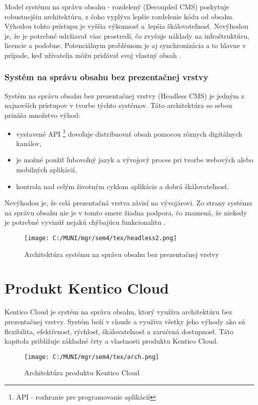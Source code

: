 \documentclass[
  printed, %
  table,   %
  lof,     %
  nolot,     %
  twoside,  
]{fithesis3}
\begin{document}
Model systému na správu obsahu - rozdelený (Decoupled CMS) poskytuje robustnejšiu architektúru, z čoho vyplýva lepšie rozdelenie kódu od obsahu. Výhodou tohto prístupu je vyššia výkonnosť a~lepšia škálovateľnosť. Nevýhodou je, že je potrebné udržiavať viac prostredí, čo zvyšuje náklady na infraštruktúru, licencie a podobne. Potenciálnym problémom je aj synchronizácia a to hlavne v prípade, keď užívatelia môžu pridávať svoj vlastný obsah \cite{cmsGuide}.

\subsection{Systém na správu obsahu bez prezentačnej vrstvy}
Systém na správu obsahu bez prezentačnej vrstvy (Headless CMS) je jedným z najnovších prístupov v tvorbe týchto systémov. Táto architektúra so sebou prináša množstvo výhod:
\begin{itemize}
	\item vystavené API \footnote{API - rozhranie pre programovanie aplikácií} dovoľuje distribuovať obsah pomocou rôznych digitálnych kanálov, 
	\item je možné použiť ľubovoľný jazyk a vývojový proces pri tvorbe webových alebo mobilných aplikácií,
	\item kontrola nad celým životným cyklom aplikácie a dobrá škálovateľnosť.
\end{itemize}

Nevýhodou je, že celá prezentačná vrstva závisí na vývojárovi. Zo strany systému na správu obsahu nie je v tomto smere žiadna podpora, čo znamená, že niekedy je potrebné vyvinúť nejakú chýbajúcu funkcionalitu \cite{cmsGuide}.
\begin{figure}[h]
  \begin{center}
        \texttt{[image: C:/MUNI/mgr/sem4/tex/headless2.png]}
  \end{center}
  \caption{Architektúra systému na správu obsahu bez prezentačnej vrstvy}
  \label{fig:headless}
\end{figure}


\chapter{Produkt Kentico Cloud}
Kentico Cloud je systém na správu obsahu, ktorý využíva architektúru bez prezentačnej vrstvy. Systém beží v cloude a využíva všetky jeho výhody ako sú flexibilita, efektívnosť, rýchlosť, škálovateľnosť a zaručená dostupnosť. Táto kapitola približuje základné črty a vlastnosti produktu Kentico Cloud.
\begin{figure}[h]
  \begin{center}
        \texttt{[image: C:/MUNI/mgr/sem4/tex/arch.png]}
  \end{center}
  \caption{Architektúra produktu Kentico Cloud \cite{cmsGuide}}
  \label{fig:kc}
\end{figure}
\end{document}
